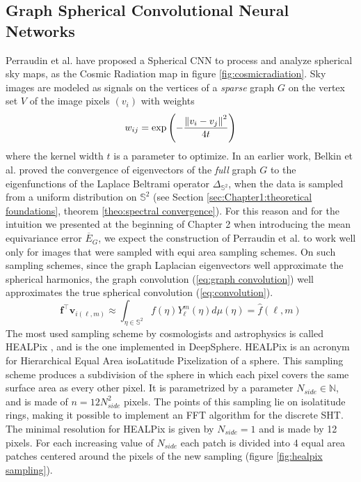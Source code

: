 \subsection{Graph Spherical Convolutional Neural Networks} \label{sec:Chapter1:DeepSphere}
Perraudin et al. \cite{DeepSphere} have proposed a Spherical CNN to process and analyze spherical sky maps, as the Cosmic Radiation map in figure \ref{fig:cosmicradiation}. Sky images are modeled as signals on the vertices of a \textit{sparse} graph $G$ on the vertex set $V$ of the image pixels $(v_i)$ with weights
$$
w_{ij}=\exp \left(-\frac{\left\lVert v_i-v_j\right\rVert^2}{4t}\right)
$$
where the kernel width $t$ is a parameter to optimize. In an earlier work, Belkin et al. \cite{NIPS2006_2989} proved the convergence of eigenvectors of the \textit{full} graph $G$ to the eigenfunctions of the Laplace Beltrami operator $\Delta_{\mathbb S^2}$, when the data is sampled from a uniform distribution on $\mathbb S^2$ (see Section \ref{sec:Chapter1:theoretical foundations}, theorem \ref{theo:spectral convergence}). For this reason and for the intuition we presented at the beginning of Chapter 2 when introducing the mean equivariance error $\overline E_G$, we expect the construction of Perraudin et al. to work well only for images that were sampled with equi area sampling schemes. On such sampling schemes, since the graph Laplacian eigenvectors well approximate the spherical harmonics, the graph convolution (\ref{eq:graph convolution}) well approximates the true spherical convolution (\ref{eq:convolution}).
\begin{equation}\label{eq:approx}
\mathbf f^\intercal\mathbf v_{i(\ell, m)} \approx \int_{\eta \in \mathbb S^2}f(\eta)Y_\ell^m(\eta)d\mu(\eta)=\hat f(\ell,m)
\end{equation}
The most used sampling scheme by cosmologists and astrophysics is called HEALPix \cite{HEALPix}, and is the one implemented in DeepSphere. HEALPix is an acronym for Hierarchical Equal Area isoLatitude Pixelization of a sphere. This sampling scheme produces a subdivision of the sphere in which each pixel covers the same surface area as every other pixel. It is parametrized by a parameter $N_{side}\in\mathbb N$, and is made of $n=12N_{side}^2$ pixels. The points of this sampling lie on isolatitude rings, making it possible to implement an FFT algorithm for the discrete SHT. The minimal resolution for HEALPix is given by $N_{side}=1$ and is made by 12 pixels. For each increasing value of $N_{side}$ each patch is divided into 4 equal area patches centered around the pixels of the new sampling (figure \ref{fig:healpix sampling}).


